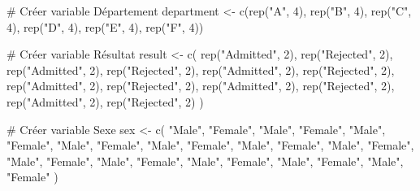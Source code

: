 \documentclass[
  letterpaper,
]{book}
\newenvironment{Shaded}{\begin{snugshade}}{\end{snugshade}}
\newcommand{\CommentTok}[1]{\textcolor[rgb]{0.37,0.37,0.37}{#1}}
\newcommand{\DecValTok}[1]{\textcolor[rgb]{0.68,0.00,0.00}{#1}}
\newcommand{\FunctionTok}[1]{\textcolor[rgb]{0.28,0.35,0.67}{#1}}
\newcommand{\NormalTok}[1]{\textcolor[rgb]{0.00,0.23,0.31}{#1}}
\newcommand{\OtherTok}[1]{\textcolor[rgb]{0.00,0.23,0.31}{#1}}
\newcommand{\StringTok}[1]{\textcolor[rgb]{0.13,0.47,0.30}{#1}}
\begin{document}
\begin{Shaded}
\begin{Highlighting}[]
\CommentTok{\# Créer variable Département}
\NormalTok{department }\OtherTok{\textless{}{-}} \FunctionTok{c}\NormalTok{(}\FunctionTok{rep}\NormalTok{(}\StringTok{"A"}\NormalTok{, }\DecValTok{4}\NormalTok{),}
                \FunctionTok{rep}\NormalTok{(}\StringTok{"B"}\NormalTok{, }\DecValTok{4}\NormalTok{),}
                \FunctionTok{rep}\NormalTok{(}\StringTok{"C"}\NormalTok{, }\DecValTok{4}\NormalTok{),}
                \FunctionTok{rep}\NormalTok{(}\StringTok{"D"}\NormalTok{, }\DecValTok{4}\NormalTok{),}
                \FunctionTok{rep}\NormalTok{(}\StringTok{"E"}\NormalTok{, }\DecValTok{4}\NormalTok{),}
                \FunctionTok{rep}\NormalTok{(}\StringTok{"F"}\NormalTok{, }\DecValTok{4}\NormalTok{))}

\CommentTok{\# Créer variable Résultat}
\NormalTok{result }\OtherTok{\textless{}{-}} \FunctionTok{c}\NormalTok{(}
  \FunctionTok{rep}\NormalTok{(}\StringTok{"Admitted"}\NormalTok{, }\DecValTok{2}\NormalTok{),}
  \FunctionTok{rep}\NormalTok{(}\StringTok{"Rejected"}\NormalTok{, }\DecValTok{2}\NormalTok{),}
  \FunctionTok{rep}\NormalTok{(}\StringTok{"Admitted"}\NormalTok{, }\DecValTok{2}\NormalTok{),}
  \FunctionTok{rep}\NormalTok{(}\StringTok{"Rejected"}\NormalTok{, }\DecValTok{2}\NormalTok{),}
  \FunctionTok{rep}\NormalTok{(}\StringTok{"Admitted"}\NormalTok{, }\DecValTok{2}\NormalTok{),}
  \FunctionTok{rep}\NormalTok{(}\StringTok{"Rejected"}\NormalTok{, }\DecValTok{2}\NormalTok{),}
  \FunctionTok{rep}\NormalTok{(}\StringTok{"Admitted"}\NormalTok{, }\DecValTok{2}\NormalTok{),}
  \FunctionTok{rep}\NormalTok{(}\StringTok{"Rejected"}\NormalTok{, }\DecValTok{2}\NormalTok{),}
  \FunctionTok{rep}\NormalTok{(}\StringTok{"Admitted"}\NormalTok{, }\DecValTok{2}\NormalTok{),}
  \FunctionTok{rep}\NormalTok{(}\StringTok{"Rejected"}\NormalTok{, }\DecValTok{2}\NormalTok{),}
  \FunctionTok{rep}\NormalTok{(}\StringTok{"Admitted"}\NormalTok{, }\DecValTok{2}\NormalTok{),}
  \FunctionTok{rep}\NormalTok{(}\StringTok{"Rejected"}\NormalTok{, }\DecValTok{2}\NormalTok{)}
\NormalTok{)}

\CommentTok{\# Créer variable Sexe}
\NormalTok{sex }\OtherTok{\textless{}{-}} \FunctionTok{c}\NormalTok{(}
  \StringTok{"Male"}\NormalTok{,}
  \StringTok{"Female"}\NormalTok{,}
  \StringTok{"Male"}\NormalTok{,}
  \StringTok{"Female"}\NormalTok{,}
  \StringTok{"Male"}\NormalTok{,}
  \StringTok{"Female"}\NormalTok{,}
  \StringTok{"Male"}\NormalTok{,}
  \StringTok{"Female"}\NormalTok{,}
  \StringTok{"Male"}\NormalTok{,}
  \StringTok{"Female"}\NormalTok{,}
  \StringTok{"Male"}\NormalTok{,}
  \StringTok{"Female"}\NormalTok{,}
  \StringTok{"Male"}\NormalTok{,}
  \StringTok{"Female"}\NormalTok{,}
  \StringTok{"Male"}\NormalTok{,}
  \StringTok{"Female"}\NormalTok{,}
  \StringTok{"Male"}\NormalTok{,}
  \StringTok{"Female"}\NormalTok{,}
  \StringTok{"Male"}\NormalTok{,}
  \StringTok{"Female"}\NormalTok{,}
  \StringTok{"Male"}\NormalTok{,}
  \StringTok{"Female"}\NormalTok{,}
  \StringTok{"Male"}\NormalTok{,}
  \StringTok{"Female"}
\NormalTok{)}


\end{Highlighting}
\end{Shaded}
\end{document}
